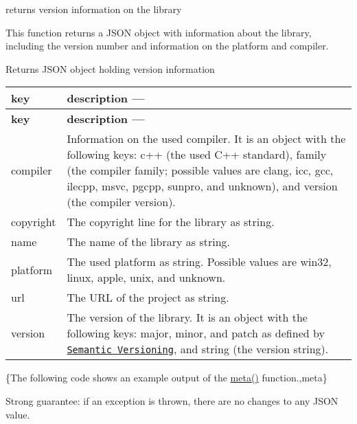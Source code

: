 returns version information on the library 

This function returns a J\+S\+ON object with information about the library, including the version number and information on the platform and compiler.

\begin{DoxyReturn}{Returns}
J\+S\+ON object holding version information \tabulinesep=1mm
\begin{longtabu} spread 0pt [c]{*{2}{|X[-1]}|}
\hline
\rowcolor{\tableheadbgcolor}\textbf{ key  }&\textbf{ description ---   }\\
\endfirsthead
\hline
\endfoot
\hline
\rowcolor{\tableheadbgcolor}\textbf{ key  }&\textbf{ description ---   }\\
\endhead
{\ttfamily compiler}  &Information on the used compiler. It is an object with the following keys\+: {\ttfamily c++} (the used C++ standard), {\ttfamily family} (the compiler family; possible values are {\ttfamily clang}, {\ttfamily icc}, {\ttfamily gcc}, {\ttfamily ilecpp}, {\ttfamily msvc}, {\ttfamily pgcpp}, {\ttfamily sunpro}, and {\ttfamily unknown}), and {\ttfamily version} (the compiler version).   \\
{\ttfamily copyright}  &The copyright line for the library as string.   \\
{\ttfamily name}  &The name of the library as string.   \\
{\ttfamily platform}  &The used platform as string. Possible values are {\ttfamily win32}, {\ttfamily linux}, {\ttfamily apple}, {\ttfamily unix}, and {\ttfamily unknown}.   \\
{\ttfamily url}  &The U\+RL of the project as string.   \\
{\ttfamily version}  &The version of the library. It is an object with the following keys\+: {\ttfamily major}, {\ttfamily minor}, and {\ttfamily patch} as defined by \href{http://semver.org}{\tt Semantic Versioning}, and {\ttfamily string} (the version string).   \\
\end{longtabu}

\end{DoxyReturn}
\{The following code shows an example output of the {\ttfamily \mbox{\hyperlink{classnlohmann_1_1basic__json_aef6d0eeccee7c5c7e1317c2ea1607fab}{meta()}}} function.,meta\}

Strong guarantee\+: if an exception is thrown, there are no changes to any J\+S\+ON value.

